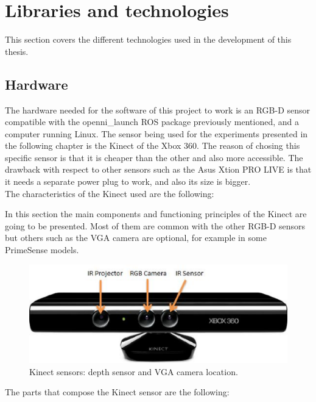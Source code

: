 \newpage
\section{Libraries and technologies}
\label{libraries_and_technologies}

This section covers the different technologies used in the development of this thesis.
	\subsection{Hardware}

		The hardware needed for the software of this project to work is an RGB-D sensor compatible with the openni\_launch ROS package previously mentioned, and a computer running Linux. 
		The sensor being used for the experiments presented in the following chapter is the Kinect of the Xbox 360. The reason of chosing this specific sensor is that it is cheaper than the other
		and also more accessible. The drawback with respect to other sensors such as the Asus Xtion PRO LIVE\cite{xtion} is that it needs a separate power plug to work, and also its size is bigger. 
		\\

		The characteristics of the Kinect used are the following: 


		In this section the main components and functioning principles of the Kinect are going to be presented. Most of them are common with the other RGB-D sensors but others such as the VGA camera are optional, for example in some PrimeSense\cite{PrimeSense} models. 

		\begin{figure}[h]
			\begin{center}
		\includegraphics[scale=0.5]{img/kinect/kinect2.eps}
			\caption[Kinect Sensors]{Kinect sensors: depth sensor and VGA camera location.}
			\end{center}
		\end{figure}


		The parts that compose the Kinect sensor are the following: 

